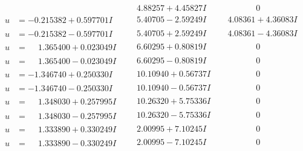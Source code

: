 \documentclass[1p]{elsarticle_modified}
\theoremstyle{definition}
\begin{document}
$$\begin{array}{c|c|c}
 & \phantom{-}4.88257 + 4.45827 I & \phantom{-0.000000 } 0 \\ \hline\begin{aligned}
u &= -0.215382 + 0.597701 I\end{aligned}
 & \phantom{-}5.40705 - 2.59249 I & \phantom{-}4.08361 + 4.36083 I \\ \hline\begin{aligned}
u &= -0.215382 - 0.597701 I\end{aligned}
 & \phantom{-}5.40705 + 2.59249 I & \phantom{-}4.08361 - 4.36083 I \\ \hline\begin{aligned}
u &= \phantom{-}1.365400 + 0.023049 I\end{aligned}
 & \phantom{-}6.60295 + 0.80819 I & \phantom{-0.000000 } 0 \\ \hline\begin{aligned}
u &= \phantom{-}1.365400 - 0.023049 I\end{aligned}
 & \phantom{-}6.60295 - 0.80819 I & \phantom{-0.000000 } 0 \\ \hline\begin{aligned}
u &= -1.346740 + 0.250330 I\end{aligned}
 & \phantom{-}10.10940 + 0.56737 I & \phantom{-0.000000 } 0 \\ \hline\begin{aligned}
u &= -1.346740 - 0.250330 I\end{aligned}
 & \phantom{-}10.10940 - 0.56737 I & \phantom{-0.000000 } 0 \\ \hline\begin{aligned}
u &= \phantom{-}1.348030 + 0.257995 I\end{aligned}
 & \phantom{-}10.26320 + 5.75336 I & \phantom{-0.000000 } 0 \\ \hline\begin{aligned}
u &= \phantom{-}1.348030 - 0.257995 I\end{aligned}
 & \phantom{-}10.26320 - 5.75336 I & \phantom{-0.000000 } 0 \\ \hline\begin{aligned}
u &= \phantom{-}1.333890 + 0.330249 I\end{aligned}
 & \phantom{-}2.00995 + 7.10245 I & \phantom{-0.000000 } 0 \\ \hline\begin{aligned}
u &= \phantom{-}1.333890 - 0.330249 I\end{aligned}
 & \phantom{-}2.00995 - 7.10245 I & \phantom{-0.000000 } 0 \\ \hline\begin{aligned}

\end{aligned}
\end{array}$$
\end{document}
